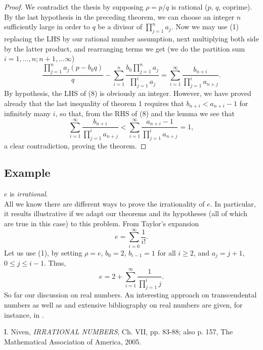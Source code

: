 \documentclass[12pt]{article}
\begin{document}
\begin{proof}
We contradict the thesis by supposing $\rho = p/q$ is rational ($p$, $q$, coprime). By the last hypothesis in the preceding theorem, we can choose an integer $n$ sufficiently large in order to $q$ be a divisor of $\prod_{j=1}^n a_j$. Now we may use (1) replacing the LHS by our rational number assumption, next multiplying both side by the latter product, and rearranging terms we get (we do the partition sum $i=1,\ldots,n; n+1, \ldots \infty$)
\begin{equation}
\frac{\prod_{j=1}^n a_j(p - b_0 q)}{q} - \sum_{i=1}^n \frac{b_0\prod_{j=1}^n a_j}{\prod_{j=1}^i a_j} = \sum_{i=1}^\infty \frac{b_{n+i}}{\prod_{j=1}^i a_{n+j}}.
\end{equation}
By hypothesis, the LHS of (8) is obviously an integer. However, we have proved already that the last inequality of theorem 1 requires that $b_{n+i} < a_{n+i} - 1$ for infinitely many $i$, so that, from the RHS of (8) and the lemma we see that
\begin{equation*}
\sum_{i=1}^\infty \frac{b_{n+i}}{\prod_{j=1}^i a_{n+j}} < \sum_{i=1}^\infty \frac{a_{n+i}-1}{\prod_{j=1}^i a_{n+j}} = 1,
\end{equation*}
a clear contradiction, proving the theorem.
\end{proof}  
\subsection{Example}
$e$ is \emph{irrational}. \\
All we know there are different ways to prove the irrationality of $e$. In particular, it results illustrative if we adapt our theorems and its hypotheses (all of which are true in this case) to this problem. From Taylor's expansion
\begin{equation*}
e = \sum_{i=0}^\infty \frac{1}{i!}.
\end{equation*}         
Let us use (1), by setting $\rho = e$, $b_0 = 2$, $b_{i-1} = 1$ for all $i \geq 2$, and $a_j = j+1$, $0\leq j \leq i-1$. Thus,
\begin{equation*}
e = 2 + \sum_{i=1}^\infty \frac{1}{\prod_{j=1}^i j}. 
\end{equation*} 
So far our discussion on real numbers. An interesting approach on transcendental numbers as well as and extensive bibliography on real numbers are given, for instance, in \cite{cite:Niven}. \\


\begin{thebibliography}{1}
I. Niven, \emph{IRRATIONAL NUMBERS}, Ch. VII, pp. 83-88; also p. 157, The Mathematical Association of America, 2005.
\end{thebibliography}

\end{document}
